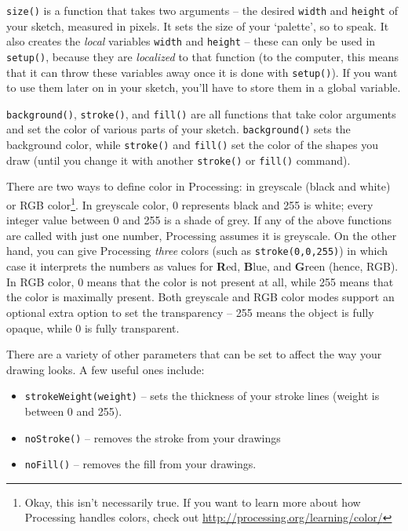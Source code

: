\texttt{size()} is a function that takes two arguments -- the desired \texttt{width} and \texttt{height} of your sketch, measured in pixels.  It sets the size of your `palette', so to speak.  It also creates the \emph{local} variables \texttt{width} and \texttt{height} -- these can only be used in \texttt{setup()}, because they are \emph{localized} to that function (to the computer, this means that it can throw these variables away once it is done with \texttt{setup()}).  If you want to use them later on in your sketch, you'll have to store them in a global variable.

\texttt{background()}, \texttt{stroke()}, and \texttt{fill()} are all functions that take color arguments and set the color of various parts of your sketch.  \texttt{background()} sets the background color, while \texttt{stroke()} and \texttt{fill()} set the color of the shapes you draw (until you change it with another \texttt{stroke()} or \texttt{fill()} command).

There are two ways to define color in Processing: in greyscale (black and white) or RGB color\footnote{Okay, this isn't necessarily true.  If you want to learn more about how Processing handles colors, check out \url{http://processing.org/learning/color/}}.  In greyscale color, 0 represents black and 255 is white; every integer value between 0 and 255 is a shade of grey.  If any of the above functions are called with just one number, Processing assumes it is greyscale.  On the other hand, you can give Processing \emph{three} colors (such as \texttt{stroke(0,0,255)}) in which case it interprets the numbers as values for \textbf{R}ed, \textbf{B}lue, and \textbf{G}reen (hence, RGB).  In RGB color, 0 means that the color is not present at all, while 255 means that the color is maximally present.  Both greyscale and RGB color modes support an optional extra option to set the transparency -- 255 means the object is fully opaque, while 0 is fully transparent.

There are a variety of other parameters that can be set to affect the way your drawing looks.  A few useful ones include:

\begin{itemize}
\item \texttt{strokeWeight(weight)} -- sets the thickness of your stroke lines (weight is between 0 and 255).
\item \texttt{noStroke()} -- removes the stroke from your drawings
\item \texttt{noFill()} -- removes the fill from your drawings.
\end{itemize}

